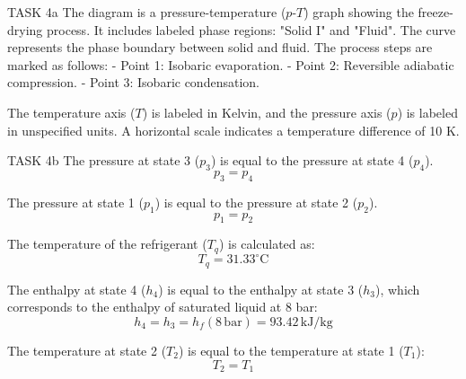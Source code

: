 TASK 4a  
The diagram is a pressure-temperature (\( p \)-\( T \)) graph showing the freeze-drying process. It includes labeled phase regions: "Solid I" and "Fluid". The curve represents the phase boundary between solid and fluid. The process steps are marked as follows:  
- Point 1: Isobaric evaporation.  
- Point 2: Reversible adiabatic compression.  
- Point 3: Isobaric condensation.  

The temperature axis (\( T \)) is labeled in Kelvin, and the pressure axis (\( p \)) is labeled in unspecified units. A horizontal scale indicates a temperature difference of 10 K.  

TASK 4b  
The pressure at state 3 (\( p_3 \)) is equal to the pressure at state 4 (\( p_4 \)).  
\[
p_3 = p_4
\]  

The pressure at state 1 (\( p_1 \)) is equal to the pressure at state 2 (\( p_2 \)).  
\[
p_1 = p_2
\]  

The temperature of the refrigerant (\( T_q \)) is calculated as:  
\[
T_q = 31.33^\circ \text{C}
\]  

The enthalpy at state 4 (\( h_4 \)) is equal to the enthalpy at state 3 (\( h_3 \)), which corresponds to the enthalpy of saturated liquid at 8 bar:  
\[
h_4 = h_3 = h_f(8 \, \text{bar}) = 93.42 \, \text{kJ/kg}
\]  

The temperature at state 2 (\( T_2 \)) is equal to the temperature at state 1 (\( T_1 \)):  
\[
T_2 = T_1
\]